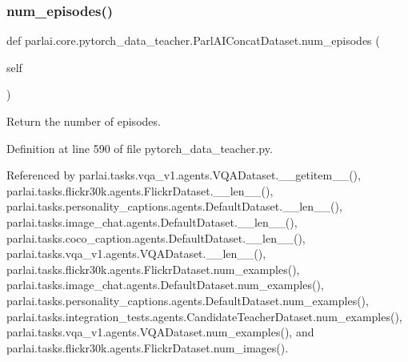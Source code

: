 \subsubsection{\texorpdfstring{num\+\_\+episodes()}{num\_episodes()}}
{\footnotesize\ttfamily def parlai.\+core.\+pytorch\+\_\+data\+\_\+teacher.\+Parl\+A\+I\+Concat\+Dataset.\+num\+\_\+episodes (\begin{DoxyParamCaption}\item[{}]{self }\end{DoxyParamCaption})}

\begin{DoxyVerb}Return the number of episodes.\end{DoxyVerb}
 

Definition at line 590 of file pytorch\+\_\+data\+\_\+teacher.\+py.



Referenced by parlai.\+tasks.\+vqa\+\_\+v1.\+agents.\+V\+Q\+A\+Dataset.\+\_\+\+\_\+getitem\+\_\+\+\_\+(), parlai.\+tasks.\+flickr30k.\+agents.\+Flickr\+Dataset.\+\_\+\+\_\+len\+\_\+\+\_\+(), parlai.\+tasks.\+personality\+\_\+captions.\+agents.\+Default\+Dataset.\+\_\+\+\_\+len\+\_\+\+\_\+(), parlai.\+tasks.\+image\+\_\+chat.\+agents.\+Default\+Dataset.\+\_\+\+\_\+len\+\_\+\+\_\+(), parlai.\+tasks.\+coco\+\_\+caption.\+agents.\+Default\+Dataset.\+\_\+\+\_\+len\+\_\+\+\_\+(), parlai.\+tasks.\+vqa\+\_\+v1.\+agents.\+V\+Q\+A\+Dataset.\+\_\+\+\_\+len\+\_\+\+\_\+(), parlai.\+tasks.\+flickr30k.\+agents.\+Flickr\+Dataset.\+num\+\_\+examples(), parlai.\+tasks.\+image\+\_\+chat.\+agents.\+Default\+Dataset.\+num\+\_\+examples(), parlai.\+tasks.\+personality\+\_\+captions.\+agents.\+Default\+Dataset.\+num\+\_\+examples(), parlai.\+tasks.\+integration\+\_\+tests.\+agents.\+Candidate\+Teacher\+Dataset.\+num\+\_\+examples(), parlai.\+tasks.\+vqa\+\_\+v1.\+agents.\+V\+Q\+A\+Dataset.\+num\+\_\+examples(), and parlai.\+tasks.\+flickr30k.\+agents.\+Flickr\+Dataset.\+num\+\_\+images().

